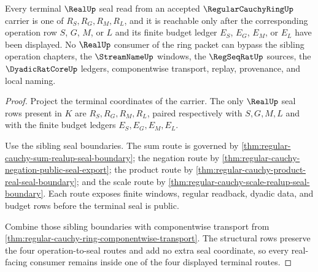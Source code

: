 \begin{theorem}
\label{thm:regular-cauchy-ring-terminal-seal-discipline}
Every terminal $\RealUp$ seal read from an accepted $\RegularCauchyRingUp$ carrier is one of $R_S,R_G,R_M,R_L$, and it is reachable only after the corresponding operation row $S$, $G$, $M$, or $L$ and its finite budget ledger $E_S$, $E_G$, $E_M$, or $E_L$ have been displayed. No $\RealUp$ consumer of the ring packet can bypass the sibling operation chapters, the $\StreamNameUp$ windows, the $\RegSeqRatUp$ sources, the $\DyadicRatCoreUp$ ledgers, componentwise transport, replay, provenance, and local naming.
\end{theorem}
\begin{proof}
Project the terminal coordinates of the carrier. The only $\RealUp$ seal rows present in $K$ are $R_S,R_G,R_M,R_L$, paired respectively with $S,G,M,L$ and with the finite budget ledgers $E_S,E_G,E_M,E_L$.

Use the sibling seal boundaries. The sum route is governed by \autoref{thm:regular-cauchy-sum-realup-seal-boundary}; the negation route by \autoref{thm:regular-cauchy-negation-public-seal-export}; the product route by \autoref{thm:regular-cauchy-product-real-seal-boundary}; and the scale route by \autoref{thm:regular-cauchy-scale-realup-seal-boundary}. Each route exposes finite windows, regular readback, dyadic data, and budget rows before the terminal seal is public.

Combine those sibling boundaries with componentwise transport from \autoref{thm:regular-cauchy-ring-componentwise-transport}. The structural rows preserve the four operation-to-seal routes and add no extra seal coordinate, so every real-facing consumer remains inside one of the four displayed terminal routes.
\end{proof}

